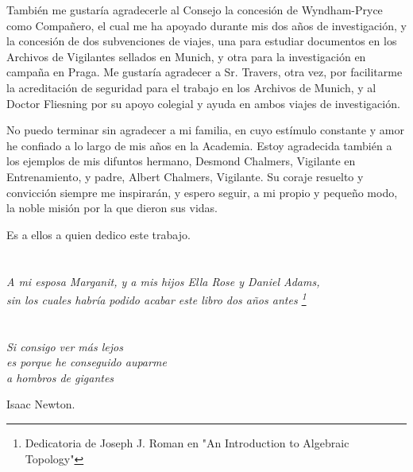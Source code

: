 También me gustaría agradecerle al Consejo la concesión de Wyndham-Pryce como Compañero, el cual me ha apoyado durante mis dos años de investigación, y la concesión de dos subvenciones de viajes, una para estudiar documentos en los Archivos de Vigilantes sellados en Munich, y otra para la investigación en campaña en Praga. Me gustaría agradecer a Sr. Travers, otra vez, por facilitarme  la acreditación  de seguridad para el trabajo en los Archivos de Munich, y al Doctor Fliesning por su apoyo colegial y ayuda en ambos viajes de investigación.

No puedo terminar sin agradecer a mi familia, en cuyo estímulo constante y amor he confiado a lo largo de mis años en la Academia. Estoy agradecida también a los ejemplos de mis  difuntos hermano, Desmond Chalmers, Vigilante en Entrenamiento, y padre, Albert Chalmers, Vigilante. Su coraje resuelto y convicción siempre me inspirarán, y espero seguir, a mi propio y pequeño modo, la noble misión por la que dieron sus vidas. 

Es a ellos a quien dedico este trabajo.

\cleardoublepage %

\chapter*{}
\setlength{\leftmargin}{0.5\textwidth}
\setlength{\parsep}{0cm}
\addtolength{\topsep}{0.5cm}

\begin{flushright}
	\small\em{
		A mi esposa Marganit, y a mis hijos Ella Rose y Daniel Adams,\\
		sin los cuales habría podido acabar este libro dos años antes \footnote{Dedicatoria de Joseph J. Roman en "An Introduction to Algebraic Topology"}
	}
\end{flushright}


\cleardoublepage %

\chapter*{}

\setlength{\leftmargin}{0.5\textwidth}
\setlength{\parsep}{0cm}
\addtolength{\topsep}{0.5cm}
\begin{flushright}
	\small\em{
		Si consigo ver más lejos\\
		es porque he conseguido auparme\\ 
		a hombros de gigantes
	}
\end{flushright}

\begin{flushright}
	\small{
		Isaac Newton.
	}
\end{flushright}

\cleardoublepage %

